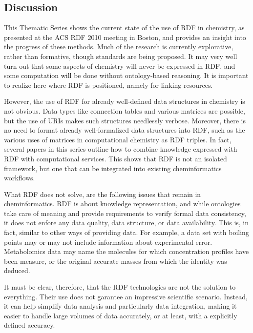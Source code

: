 \documentclass[10pt]{bmc_article}
\newenvironment{bmcformat}{\begin{raggedright}\baselineskip20pt\sloppy\setboolean{publ}{false}}{\end{raggedright}\baselineskip20pt\sloppy}
\begin{document}
\begin{bmcformat}

\section{Discussion}

This Thematic Series shows the current state of the use of RDF in
chemistry, as presented at the ACS RDF 2010 meeting in Boston, and provides an
insight into the progress of these methods. Much of the research is currently explorative,
rather than formative, though standards are being proposed.
It may very well turn out that some aspects of chemistry will never be expressed
in RDF, and some computation will be done without ontology-based reasoning. It is important
to realize here where RDF is positioned, namely for linking resources.

However, the use of RDF for already well-defined data structures in chemistry
is not obvious. Data types like connection tables and various matrices are possible, 
but the use of URIs makes such structures needlessly verbose.
Moreover, there is no need to format already well-formalized data structures into
RDF, such as the various uses of matrices in computational chemistry as
RDF triples.
In fact, several papers in this series outline how to
combine knowledge expressed with RDF with computational services.
This shows that RDF is not an isolated framework, but one that can be
integrated into existing cheminformatics workflows.

What RDF does not solve, are the following issues that remain in
cheminformatics. RDF is about knowledge representation, and while
ontologies take care of meaning and provide requirements to verify formal data consistency, 
it does not enfore any data quality, data structure, or data availability. 
This is, in fact, similar to other
ways of providing data. For example, a data set with boiling points
may or may not include information about experimental error.
Metabolomics data may name the molecules for which concentration
profiles have been measure, or the original accurate masses from
which the identity was deduced.


It must be clear, therefore, that the RDF technologies are not the solution
to everything. Their use does not garantee an impressive scientific
scenario. Instead, it can help simplify data analysis and particularly
data integration, making it easier to handle large volumes of
data accurately, or at least, with a explicitly defined accuracy.


\end{bmcformat}
\end{document}
